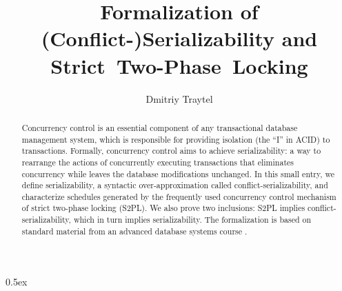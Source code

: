 \documentclass[11pt,a4paper]{article}
\begin{document}
\title{Formalization of (Conflict-)Serializability and Strict~Two-Phase~Locking}
\author{Dmitriy Traytel}
\maketitle

\begin{abstract} Concurrency control is an essential component of any transactional database management system, which is responsible for providing isolation (the ``I'' in ACID) to
transactions. Formally, concurrency control aims to achieve serializability: a way to rearrange the actions of concurrently executing transactions that eliminates concurrency while leaves the
database modifications unchanged. In this small entry, we define serializability, a syntactic over-approximation called conflict-serializability, and characterize schedules generated by the
frequently used concurrency control mechanism of strict two-phase locking (S2PL). We also prove two inclusions: S2PL implies conflict-serializabili\-ty, which in turn implies serializability.
The formalization is based on standard material from an advanced database systems course \cite[Chapter 17]{ramakrishnan2003database}. \end{abstract}


\parindent 0pt\parskip 0.5ex





\end{document}
